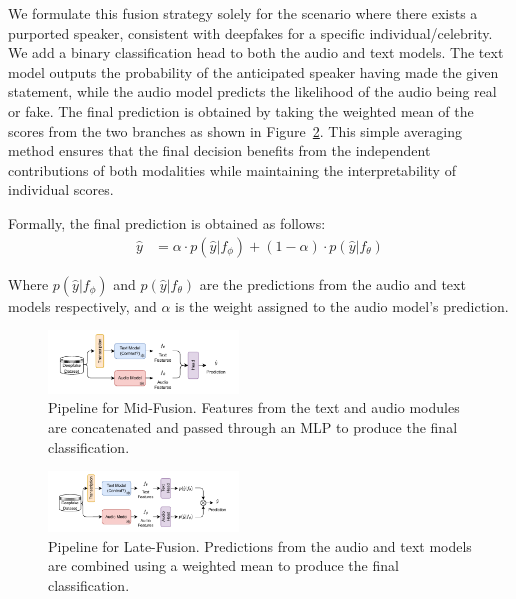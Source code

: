 \documentclass{Interspeech}
\begin{document}
We formulate this fusion strategy solely for the scenario where there exists a
purported speaker, consistent with deepfakes for a specific
individual/celebrity. We add a binary classification head to both the audio and
text models. The text model outputs the probability of the anticipated speaker
having made the given statement, while the audio model predicts the likelihood
of the audio being real or fake. The final prediction is obtained by taking the
weighted mean of the scores from the two branches as shown in
Figure~\ref{fig:late_fusion}. This simple averaging method ensures that the
final decision benefits from the independent contributions of both modalities
while maintaining the interpretability of individual scores.

Formally, the final prediction is obtained as follows:
\begin{align}
  \hat{y} & = \alpha \cdot p(\hat{y}|f_\phi) + (1-\alpha) \cdot p(\hat{y}|f_\theta)
\end{align}

Where $p(\hat{y}|f_\phi)$ and $p(\hat{y}|f_\theta)$ are the predictions from
the audio and text models respectively, and $\alpha$ is the weight assigned to
the audio model's prediction.




\begin{figure}[t]
  \centering
  \includegraphics[width=0.45\textwidth]{figures/mid_fusion_small.pdf}
  \caption{Pipeline for Mid-Fusion. Features from the text and audio modules are concatenated and passed through an MLP to produce the final classification.}\label{fig:mid_fusion}
\end{figure}

\begin{figure}[t]
  \centering
  \includegraphics[width=0.45\textwidth]{figures/late_fusion_small.pdf}
  \caption{Pipeline for Late-Fusion. Predictions from the audio and text models are combined using a weighted mean to produce the final classification.}\label{fig:late_fusion}
\end{figure}
\end{document}
